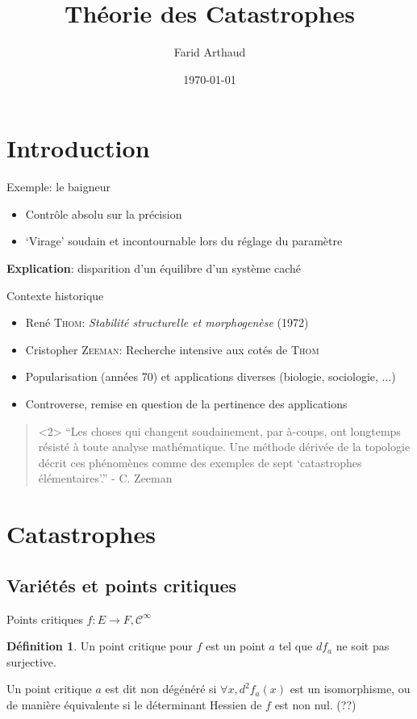 \documentclass[compress]{beamer}
\author{Farid Arthaud}
\title{Théorie des Catastrophes}
\date{\today}
\newcommand{\cinf}{\mathcal{C}^\infty}
\theoremstyle{definition}
\newtheorem{defn}{Définition}
\begin{document}
\frame{\titlepage}

\frame{\tableofcontents}

\section*{Introduction}
\begin{frame}{Exemple: le baigneur}
    \begin{itemize}
        \item Contrôle absolu sur la précision
        \item `Virage' soudain et incontournable lors du réglage du paramètre
        \pause
    \end{itemize}
    \textbf{Explication}: disparition d'un équilibre d'un système caché
\end{frame}

\begin{frame}{Contexte historique}
    \begin{itemize}
        \item René \textsc{Thom}: \textit{Stabilité structurelle et morphogenèse} (1972)
        \item Cristopher \textsc{Zeeman}: Recherche intensive aux cotés de \textsc{Thom}
        \item Popularisation (années 70) et applications diverses (biologie, sociologie, ...)
        \item Controverse, remise en question de la pertinence des applications
    \end{itemize}
    \begin{quote}<2>
        ``Les choses qui changent soudainement, par à-coups, ont longtemps résisté à toute analyse mathématique.
        Une méthode dérivée de la topologie décrit ces phénomènes comme des exemples de sept `catastrophes élémentaires'.'' - C. Zeeman
    \end{quote}
\end{frame}

\section{Catastrophes}
\subsection{Variétés et points critiques}
\begin{frame}{Points critiques}
    $f: E \to F, \cinf$
    \begin{defn}
        Un point critique pour $f$ est un point $a$ tel que $df_a$ ne soit pas surjective.

	    Un point critique $a$ est dit non dégénéré si $\forall x, d^2f_a(x)$ est un isomorphisme, ou de manière équivalente si le déterminant Hessien de $f$ est non nul. (??)
    \end{defn}
\end{frame}
\end{document}
